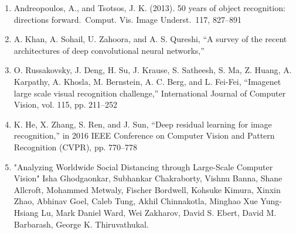 \begin{enumerate}
    \item Andreopoulos, A., and Tsotsos, J. K. (2013). 50 years of object recognition: directions forward. Comput. Vis. Image Underst. 117, 827–891
    
    \item A. Khan, A. Sohail, U. Zahoora, and A. S. Qureshi, “A survey of the recent architectures of deep convolutional neural networks,”
    
    \item O. Russakovsky, J. Deng, H. Su, J. Krause, S. Satheesh, S. Ma, Z. Huang, A. Karpathy, A. Khosla, M. Bernstein, A. C. Berg, and L. Fei-Fei, “Imagenet large scale visual recognition challenge,” International Journal of Computer Vision, vol. 115, pp. 211–252
    
    \item K. He, X. Zhang, S. Ren, and J. Sun, “Deep residual learning for image recognition,” in 2016 IEEE Conference on Computer Vision and Pattern Recognition (CVPR), pp. 770–778

    \item "Analyzing Worldwide Social Distancing through Large-Scale Computer Vision" Isha Ghodgaonkar, Subhankar Chakraborty, Vishnu Banna, Shane Allcroft, Mohammed Metwaly, Fischer Bordwell, Kohsuke Kimura, Xinxin Zhao, Abhinav Goel, Caleb Tung, Akhil Chinnakotla, Minghao Xue Yung-Hsiang Lu, Mark Daniel Ward, Wei Zakharov, David S. Ebert, David M. Barbarash, George K. Thiruvathukal.
    



    
\end{enumerate}

\newpage